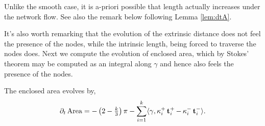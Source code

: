 \documentclass[11pt]{amsart}
\begin{document}
\begin{remark}
Unlike the smooth case, it is a-priori possible that length actually increases under the network flow. See also the remark below following Lemma \ref{lem:dtA}.
\end{remark}

It's also worth remarking that the evolution of the extrinsic distance does not feel the presence of the nodes, while the intrinsic length, being forced to traverse the nodes does. Next we compute the evolution of enclosed area, which by Stokes' theorem may be computed as an integral along \(\gamma\) and hence also feels the presence of the nodes.

\begin{lemma}
\label{lem:dtA}
The enclosed area evolves by,
\[
\partial_t \operatorname{Area} = - \left(2 - \tfrac{k}{3}\right)\pi - \sum_{i=1}^k \langle{\gamma},{\operatorname{\kappa}_i^+ \operatorname{\mathbf{t}}_i^+ - \operatorname{\kappa}_i^- \operatorname{\mathbf{t}}_i^-}\rangle.
\]
\end{lemma}
\end{document}
